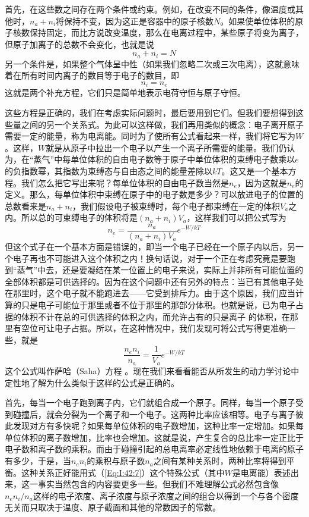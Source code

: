 首先，在这些数之间存在两个条件或约束。例如，在改变不同的条件，像温度或其他时，$n_a+n_i$将保持不变，因为这正是容器中的原子核数$N$。如果使单位体积的原子核数保持固定，而比方说改变温度，那么在电离过程中，某些原子将变为离子，但原子加离子的总数不会变化，也就是说
\begin{equation*}
    n_a+n_i=N
\end{equation*}
另一个条件是，如果整个气体呈中性（如果我们忽略二次或三次电离），这就意味着在所有时间内离子的数目等于电子的数目，即
\begin{equation*}
    n_i=n_e
\end{equation*}
这就是两个补充方程，它们只是简单地表示电荷守恒与原子守恒。

这些方程是正确的，我们在考虑实际问题时，最后要用到它们。但我们要想得到这些量之间的另一个关系式。为此可以这样做，我们再用类似的概念：电子离开原子需要一定的能量，称为电离能。同时为了使所有公式看起来一样，我们将它写为$W$。这样，$W$就是从原子中拉出一个电子以产生一个离子所需要的能量。我们仍认为，在“蒸气”中每单位体积的自由电子数等于原子中单位体积的束缚电子数乘以$e$的负指数幂，其指数为束缚态与自由态之间的能量差除以$kT$。这又是一个基本方程。我们怎么把它写出来呢？每单位体积的自由电子数当然是$n_e$，因为这就是$n_e$的定义。那么，每单位体积中束缚在原子中的电子数是多少？可以放进电子的位置的总数看来是$n_a+n_i$，我们假设电子被束缚时，每个电子都束缚在一定的体积$V_a$之内。所以总的可束缚电子的体积将是$(n_a+n_i)V_a$，这样我们可以把公式写为
\begin{equation*}
    n_e=\frac{n_a}{(n_a+n_i)V_a}e^{-W/kT}
\end{equation*}
但这个式子在一个基本方面是错误的，即当一个电子已经在一个原子内以后，另一个电子再也不可能进入这个体积之内！换句话说，对于一个正在考虑究竟是要跑到“蒸气”中去，还是要凝结在某一位置上的电子来说，实际上并非所有可能位置的全部体积都是可供选择的。因为在这个问题中还有另外的特点：当已有其他电子处在那里时，这个电子就不能跑进去——它受到排斥力。由于这个原因，我们应当计算的只是电子可能位于那里或者不位于那里的那部分体积。也就是说，已为电子占据的体积不计在总的可供选择的体积之内，而允许占有的只是离子 的体积，在那里有空位可让电子占据。所以，在这种情况中，我们发现可将公式写得更准确一些，就是
\begin{equation}
    \label{Eq:I:42:7}
    \frac{n_en_i}{n_a} = \frac{1}{V_a}e^{-W/kT}
\end{equation}
这个公式叫作萨哈（Saha）方程 。现在我们来看看能否从所发生的动力学讨论中定性地了解为什么类似于这样的公式是正确的。

首先，每当一个电子跑到离子内，它们就组合成一个原子。同样，每当一个原子受到碰撞后，就会分裂为一个离子和一个电子。这两种比率应该相等。电子与离子彼此发现对方有多快呢？如果每单位体积的电子数增加，这种比率一定增加。如果每单位体积的离子数增加，比率也会增加。这就是说，产生复合的总比率一定正比于电子数和离子数的乘积。而由于碰撞引起的总电离率必定线性地依赖于电离的原子有多少，于是，当$n_en_i$的乘积与原子数$n_a$之间有某种关系时，两种比率将得到平衡。这种关系正好能用式（\ref{Eq:I:42:7}）这个特殊公式（其中$W$是电离能）表述出来，这一事实当然包含的内容要更多一些。但我们不难理解公式必然包含像$n_e n_i /n_a$这样的电子浓度、离子浓度与原子浓度之间的组合以得到一个与各个密度无关而只取决于温度、原子截面和其他的常数因子的常数。

